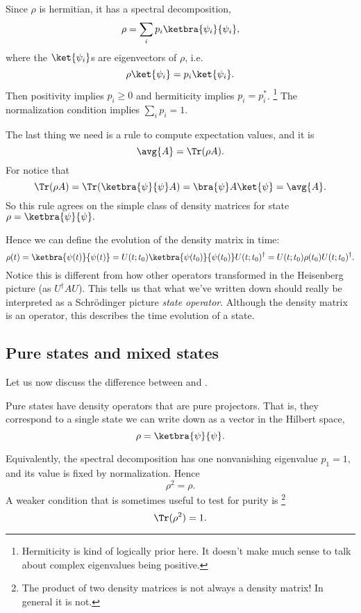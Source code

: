 Since $\rho$ is hermitian, it has a spectral decomposition,
\begin{equation}
    \rho = \sum_i p_i \ketbra{\psi_i}{\psi_i},
\end{equation}
where the $\ket{\psi_i}$s are eigenvectors of $\rho$, i.e.
\begin{equation}
    \rho\ket{\psi_i} = p_i \ket{\psi_i}.
\end{equation}
Then positivity implies $p_i\geq 0$ and hermiticity implies $p_i = p_i^*$.%
    \footnote{Hermiticity is kind of logically prior here. It doesn't make much sense to talk about complex eigenvalues being positive.}
The normalization condition implies $\sum_i p_i = 1$.

The last thing we need is a rule to compute expectation values, and it is
\begin{equation}
    \avg{A} = \Tr(\rho A).
\end{equation}
For notice that
\begin{equation}
    \Tr(\rho A) = \Tr(\ketbra{\psi}{\psi} A ) =\bra{\psi} A \ket{\psi} = \avg{A}.
\end{equation}
So this rule agrees on the simple class of density matrices for state $\rho = \ketbra{\psi}{\psi}.$

Hence we can define the evolution of the density matrix in time:
\begin{equation}
    \rho(t) = \ketbra{\psi(t)}{\psi(t)} = U(t;t_0) \ketbra{\psi(t_0)}{\psi(t_0)} U(t;t_0)^\dagger = U(t;t_0) \rho(t_0) U(t;t_0)^\dagger.
\end{equation}
Notice this is different from how other operators transformed in the Heisenberg picture (as $U^\dagger A U$). This tells us that what we've written down should really be interpreted as a Schr\"odinger picture \emph{state operator}. Although the density matrix is an operator, this describes the time evolution of a state.

\subsection*{Pure states and mixed states}
Let us now discuss the difference between  and .
\begin{defn}
    Pure states have density operators that are pure projectors. That is, they correspond to a single state we can write down as a vector in the Hilbert space,
    \begin{equation}
        \rho = \ketbra{\psi}{\psi}.
    \end{equation}
\end{defn}
Equivalently, the spectral decomposition has one nonvanishing eigenvalue $p_1=1$, and its value is fixed by normalization. Hence 
\begin{equation}
    \rho^2 =\rho.
\end{equation}
A weaker condition that is sometimes useful to test for purity is%
    \footnote{The product of two density matrices is not always a density matrix! In general it is not.}
\begin{equation}
    \Tr(\rho^2)=1.
\end{equation}
    

